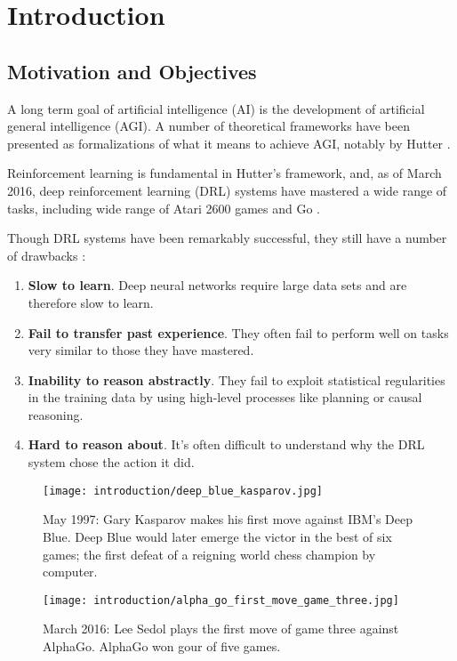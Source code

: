\chapter{Introduction}

\section{Motivation and Objectives}

A long term goal of artificial intelligence (AI) is the development of artificial general intelligence (AGI). 	A number of theoretical frameworks have been presented as formalizations of what it means to achieve AGI, notably by Hutter \cite{Hutter2005}.

Reinforcement learning is fundamental in Hutter's framework, and, as of March 2016, deep reinforcement learning (DRL) systems have mastered a wide range of tasks, including wide range of Atari 2600 games and Go \cite{Mnih2015, Silver2016}.

Though DRL systems have been remarkably successful, they still have a number of drawbacks \cite{Garnelo2016}:

\begin{enumerate}
\item \textbf{Slow to learn}. Deep neural networks require large data sets and are therefore
slow to learn.
\item \textbf{Fail to transfer past experience}. They often fail to perform well on tasks very
similar to those they have mastered.
\item \textbf{Inability to reason abstractly}. They fail to exploit statistical regularities in the
training data by using high-level processes like planning or causal reasoning.
\item \textbf{Hard to reason about}. It's often difficult to understand why the DRL
system chose the action it did.
\end{enumerate}

\begin{figure}[h!]
\centering
\begin{minipage}{.5\textwidth}
  \centering
\texttt{[image: introduction/deep\_blue\_kasparov.jpg]}
  \caption{May 1997: Gary Kasparov makes his first move against IBM's Deep Blue. Deep Blue would later emerge the victor in the best of six games; the first defeat of a reigning world chess champion by computer. \cite{Rosen2012}}
  \label{fig:deep_blue_kasparov}
\end{minipage}%
\begin{minipage}{.5\textwidth}
  \centering
\texttt{[image: introduction/alpha\_go\_first\_move\_game\_three.jpg]}
  \caption{March 2016: Lee Sedol plays the first move of game three against AlphaGo. AlphaGo won gour of five games. \cite{Ormerod2016}}
  \label{fig:alpha_go_first_move_game_three}
\end{minipage}
\end{figure}


